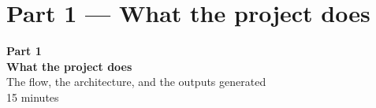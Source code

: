 \documentclass[aspectratio=169,10pt]{beamer}
\begin{document}
\section{Part 1 --- What the project does}
{
\begin{frame}[plain]
\vfill
\begin{center}
{\color{stcyan}\Large\textbf{Part 1}}\\[6pt]
{\color{white}\LARGE\textbf{What the project does}}\\[10pt]
{\color{white}\small The flow, the architecture, and the outputs generated}\\[4pt]
{\color{stcyan}\footnotesize 15 minutes}
\end{center}
\vfill
\end{frame}}
\end{document}
